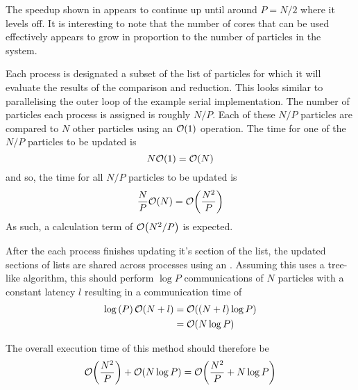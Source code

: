 The speedup shown in 
appears to continue up until around $P = N/2$ where it levels
off.
%
It is interesting to note that the number of cores that can be
used effectively appears to grow in proportion to the number of particles
in the system.

%
Each process is designated a subset of the list of particles for which
it will evaluate the results of the comparison and reduction.
%
This looks similar to parallelising the outer loop of the example
serial implementation.
%
The number of particles each process is assigned is roughly $N/P$.
%
Each of these $N/P$ particles are compared to $N$ other particles
using an $\mathcal{O}{\left({ 1 }\right)}$ operation.
%
The time for one of the $N/P$ particles to be updated is
\begin{equation}
    N\mathcal{O}{\left({ 1 }\right)} = \mathcal{O}{\left({ N }\right)}
\end  {equation}
and so, the time for all $N/P$ particles to be updated is
\begin{equation}
    \frac{N}{P}\mathcal{O}{\left({ N }\right)} = \mathcal{O}{\left({ \frac{N^2}{P} }\right)}
\end  {equation}
As such, a calculation term of $\mathcal{O}{\left({ N^2/P }\right)}$ is expected.

%
After the each process finishes updating it's section of the list,
the updated sections of lists are shared across processes using
an \mpiallgatherv{}.
Assuming this uses a tree-like algorithm, this should perform
$\log{P}$ communications of $N$ particles with a constant latency $l$
resulting in a communication time of
\begin{equation}
    \begin{split}
        \log{(P)}\,\mathcal{O}{\left({ N + l }\right)}
            &= \mathcal{O}{\left({ (N+l)\log{P} }\right)} \\
            &= \mathcal{O}{\left({ N\log{P} }\right)}
    \end{split}
\end{equation}

%
The overall execution time of this method should therefore be
\begin{equation}
    \mathcal{O}{\left({ \frac{N^2}{P} }\right)} + \mathcal{O}{\left({ N\log{P} }\right)}
        = \mathcal{O}{\left({ \frac{N^2}{P} + N\log{P} }\right)}
        \label{eqn:v0_replicated_pair_operation_overall_time}
\end{equation}


